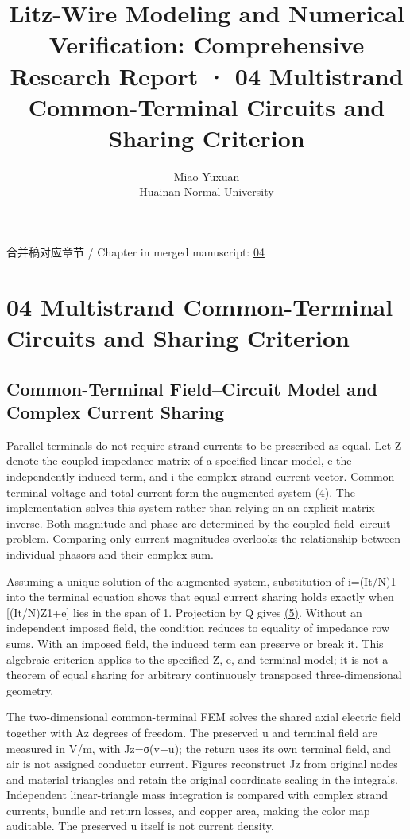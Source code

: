 \documentclass[11pt]{article}
\begin{document}
\title{Litz-Wire Modeling and Numerical Verification: Comprehensive Research Report · 04 Multistrand Common-Terminal Circuits and Sharing Criterion}
\author{Miao Yuxuan\\Huainan Normal University}
\date{}
\maketitle
\noindent 合并稿对应章节 / Chapter in merged manuscript: \href{report_en_single.pdf#chapter-04}{04}\par
\FloatBarrier
\section*{04 Multistrand Common-Terminal Circuits and Sharing Criterion}
\hypertarget{chapter-04}{}
\subsection*{Common-Terminal Field–Circuit Model and Complex Current Sharing}
\hypertarget{04.common.heading}{}
Parallel terminals do not require strand currents to be prescribed as equal. Let Z denote the coupled impedance matrix of a specified linear model, e the independently induced term, and i the complex strand-current vector. Common terminal voltage and total current form the augmented system \href{report_en_single.pdf#E04}{(4)}. The implementation solves this system rather than relying on an explicit matrix inverse. Both magnitude and phase are determined by the coupled field–circuit problem. Comparing only current magnitudes overlooks the relationship between individual phasors and their complex sum.


Assuming a unique solution of the augmented system, substitution of i=(It/N)1 into the terminal equation shows that equal current sharing holds exactly when [(It/N)Z1+e] lies in the span of 1. Projection by Q gives \href{report_en_single.pdf#E05}{(5)}. Without an independent imposed field, the condition reduces to equality of impedance row sums. With an imposed field, the induced term can preserve or break it. This algebraic criterion applies to the specified Z, e, and terminal model; it is not a theorem of equal sharing for arbitrary continuously transposed three-dimensional geometry.


The two-dimensional common-terminal FEM solves the shared axial electric field together with Az degrees of freedom. The preserved u and terminal field are measured in V/m, with Jz=σ(v−u); the return uses its own terminal field, and air is not assigned conductor current. Figures reconstruct Jz from original nodes and material triangles and retain the original coordinate scaling in the integrals. Independent linear-triangle mass integration is compared with complex strand currents, bundle and return losses, and copper area, making the color map auditable. The preserved u itself is not current density.
\end{document}
